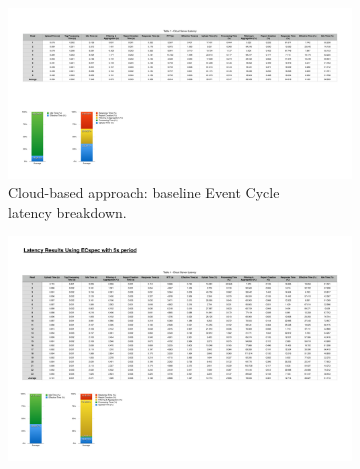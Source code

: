 \begin{figure}[ht!]
  \centering
  \begin{subfigure}{.5\textwidth}
    \centering
    \includegraphics[height=\linewidth]{./images/cloud_ecspec_effective_breakdown}
    \caption{Cloud-based approach: baseline Event Cycle\\ latency breakdown.}
    \label{fig:ecspecf_effective_base}
  \end{subfigure}%
  \begin{subfigure}{.5\textwidth}
    \centering
    \includegraphics[height=\linewidth]{./images/cloud_ecspecf_effective_breakdown}

\end{subfigure}
\end{figure}
